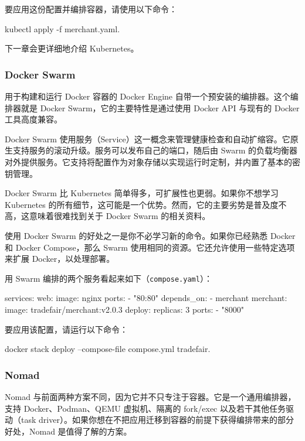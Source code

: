 \label{idx:1809}
\label{idx:1810}
要应用这份配置并编排容器，请使用以下命令：

\begin{codebox}[text]
kubectl apply -f merchant.yaml.
\end{codebox}

下一章会更详细地介绍 Kubernetes。

\subsubsection{Docker Swarm}

\label{idx:1811}
\label{idx:1812}
用于构建和运行 Docker 容器的 Docker Engine 自带一个预安装的编排器。这个编排器就是 Docker Swarm，它的主要特性是通过使用 Docker API 与现有的 Docker 工具高度兼容。

Docker Swarm 使用服务（Service）这一概念来管理健康检查和自动扩缩容。它原生支持服务的滚动升级。服务可以发布自己的端口，随后由 Swarm 的负载均衡器对外提供服务。它支持将配置作为对象存储以实现运行时定制，并内置了基本的密钥管理。

Docker Swarm 比 Kubernetes 简单得多，可扩展性也更弱。如果你不想学习 Kubernetes 的所有细节，这可能是一个优势。然而，它的主要劣势是普及度不高，这意味着很难找到关于 Docker Swarm 的相关资料。

\label{idx:1813}
\label{idx:1814}
使用 Docker Swarm 的好处之一是你不必学习新的命令。如果你已经熟悉 Docker 和 Docker Compose，那么 Swarm 使用相同的资源。它还允许使用一些特定选项来扩展 Docker，以处理部署。

用 Swarm 编排的两个服务看起来如下（\texttt{compose.\allowbreak{}yaml}）：

\begin{codebox}[yaml]
services:
  web:
    image: nginx
    ports:
      - "80:80"
    depends_on:
      - merchant
  merchant:
    image: tradefair/merchant:v2.0.3
    deploy:
      replicas: 3
    ports:
      - "8000"
\end{codebox}

要应用该配置，请运行以下命令：

\begin{codebox}[text]
docker stack deploy --compose-file compose.yml tradefair.
\end{codebox}

\subsubsection{Nomad}

\label{idx:1815}
\label{idx:1816}
Nomad 与前面两种方案不同，因为它并不只专注于容器。它是一个通用编排器，支持 Docker、Podman、QEMU 虚拟机、隔离的 fork/exec 以及若干其他任务驱动（task driver）。如果你想在不把应用迁移到容器的前提下获得编排带来的部分好处，Nomad 是值得了解的方案。

